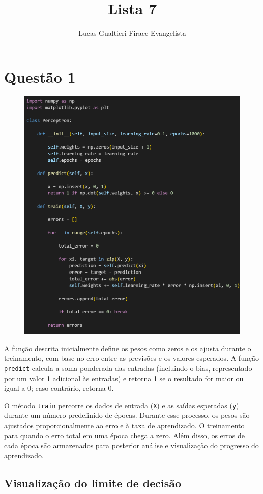\documentclass[12pt]{article}
\title{Lista 7}
\author{Lucas Gualtieri Firace Evangelista}
\date{}
\begin{document}
\maketitle

\section*{Questão 1}

\begin{figure}[h]
	\centering
	\includegraphics[width=.8\textwidth]{image1.png}
\end{figure}

A função descrita inicialmente define os pesos como zeros e os ajusta durante o treinamento, com base no erro entre as previsões e os valores esperados. A função \texttt{predict} calcula a soma ponderada das entradas (incluindo o bias, representado por um valor 1 adicional às entradas) e retorna 1 se o resultado for maior ou igual a 0; caso contrário, retorna 0.

O método \texttt{train} percorre os dados de entrada (\texttt{X}) e as saídas esperadas (\texttt{y}) durante um número predefinido de épocas. Durante esse processo, os pesos são ajustados proporcionalmente ao erro e à taxa de aprendizado. O treinamento para quando o erro total em uma época chega a zero. Além disso, os erros de cada época são armazenados para posterior análise e visualização do progresso do aprendizado.

\subsection*{Visualização do limite de decisão}
\end{document}
